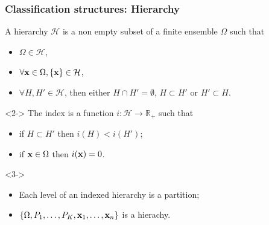 \documentclass{beamer}\usepackage[]{graphicx}\usepackage[]{color}
\begin{document}
\begin{frame}
  \frametitle{Classification structures: Hierarchy}

  \begin{definition}[Hierarchy]
    A hierarchy $\mathcal{H}$ is a non empty subset of a finite ensemble $\Omega$ such that
    \begin{itemize}
      \item $\Omega \in \mathcal{H}$,
      \item $\forall \mathbf{x} \in \Omega, \{\mathbf{x}\} \in \mathcal{H}$,
      \item $\forall H, H' \in \mathcal{H}$, then either $H \cap H' = \emptyset$, $H \subset H'$ or $H' \subset H$.
    \end{itemize}
  \end{definition}

  \vspace{-.15cm}

  \begin{definition}<2->
  The index is a function $i: \mathcal{H} \to \mathbb{R}_+$ such that  
    \begin{itemize}
      \item if $H \subset H'$ then $i(H) < i(H')$;
      \item if $\mathbf{x} \in \Omega$ then $i(\mathbf{x}) = 0$.
    \end{itemize}
  \end{definition}

  \vspace{-.15cm}

  \begin{properties}<3->
    \vspace{-.25cm}
    \begin{itemize}
      \item Each level of an indexed hierarchy is a partition;
      \item $\{\Omega, P_1, \dots, P_K, \mathbf{x}_1, \dots, \mathbf{x}_n\}$ is a hierachy.
    \end{itemize}
  \end{properties}
  
\end{frame}
\end{document}
